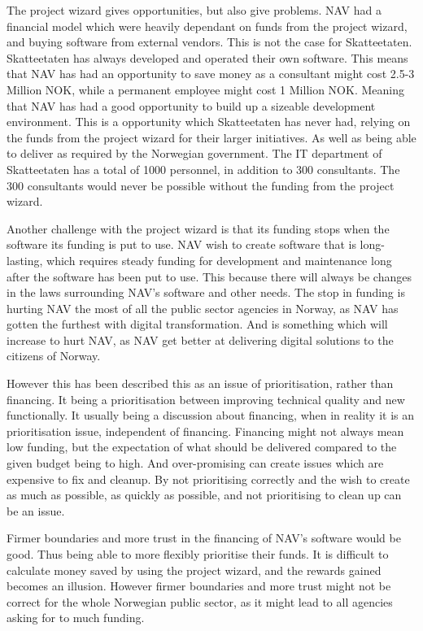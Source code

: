 The project wizard gives opportunities, but also give problems. NAV had a financial model which were heavily dependant on funds from the project wizard, and buying software from external vendors. This is not the case for Skatteetaten. Skatteetaten has always developed and operated their own software. This means that NAV has had an opportunity to save money as a consultant might cost 2.5-3 Million NOK, while a permanent employee might cost 1 Million NOK. Meaning that NAV has had a good opportunity to build up a sizeable development environment. This is a opportunity which Skatteetaten has never had, relying on the funds from the project wizard for their larger initiatives. As well as being able to deliver as required by the Norwegian government. The IT department of Skatteetaten has a total of 1000 personnel, in addition to 300 consultants. The 300 consultants would never be possible without the funding from the project wizard.

Another challenge with the project wizard is that its funding stops when the software its funding is put to use. NAV wish to create software that is long-lasting, which requires steady funding for development and maintenance long after the software has been put to use. This because there will always be changes in the laws surrounding NAV's software and other needs. The stop in funding is hurting NAV the most of all the public sector agencies in Norway, as NAV has gotten the furthest with digital transformation. And is something which will increase to hurt NAV, as NAV get better at delivering digital solutions to the citizens of Norway.

However this has been described this as an issue of prioritisation, rather than financing. It being a prioritisation between improving technical quality and new functionally. It usually being a discussion about financing, when in reality it is an prioritisation issue, independent of financing. Financing might not always mean low funding, but the expectation of what should be delivered compared to the given budget being to high. And over-promising can create issues which are expensive to fix and cleanup. By not prioritising correctly and the wish to create as much as possible, as quickly as possible, and not prioritising to clean up can be an issue.

Firmer boundaries and more trust in the financing of NAV's software would be good. Thus being able to more flexibly prioritise their funds. It is difficult to calculate money saved by using the project wizard, and the rewards gained becomes an illusion. However firmer boundaries and more trust might not be correct for the whole Norwegian public sector, as it might lead to all agencies asking for to much funding.

